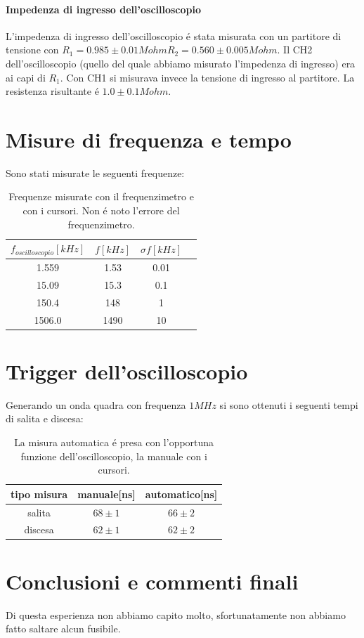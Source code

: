 \documentclass[10pt,a4paper]{article}
\begin{document}
\paragraph{Impedenza di ingresso dell'oscilloscopio}
L'impedenza di ingresso dell'oscilloscopio \'e stata misurata con un partitore di tensione con $R_1=0.985\pm 0.01 Mohm R_2=0.560\pm 0.005 Mohm$. Il CH2 dell'oscilloscopio (quello del quale abbiamo misurato l'impedenza di ingresso) era ai capi di $R_1$. Con CH1 si misurava invece la tensione di ingresso al partitore.
La resistenza risultante \'e $1.0 \pm 0.1 Mohm$.  

\section{Misure di frequenza e tempo}
Sono stati misurate le seguenti frequenze:
\begin{table}[h]
\centering
\begin{tabular}{|c|c|c|c|}
\hline 
$f_{oscilloscopio}[kHz] $& $f[kHz]$ &$\sigma f [kHz]$ \\
\hline 
1.559 & 1.53 & 0.01 \\
15.09 & 15.3 & 0.1 \\
150.4 & 148 & 1 \\
1506.0 & 1490 & 10 \\

\hline 
\end{tabular} 
\caption{Frequenze misurate con il frequenzimetro e con i cursori. Non \'e noto l'errore del frequenzimetro.\label{t:par1}}
\end{table}

\section{Trigger dell'oscilloscopio}
Generando un onda quadra con frequenza $1 MHz$ si sono ottenuti i seguenti tempi di salita e discesa:


\begin{table}[h]
\centering
\begin{tabular}{|c|c|c|}
\hline 
tipo misura& manuale[ns] & automatico[ns] \\
\hline 
salita & $68 \pm 1$ & $66 \pm 2$ \\
discesa & $62 \pm 1$ & $62 \pm 2$\\

\hline 
\end{tabular} 
\caption{La misura automatica \'e presa con l'opportuna funzione dell'oscilloscopio, la manuale con i cursori. \label{t:par1}}
\end{table}
\section{Conclusioni e commenti finali}
Di questa esperienza non abbiamo capito molto, sfortunatamente non abbiamo fatto saltare alcun fusibile. 
\end{document}
